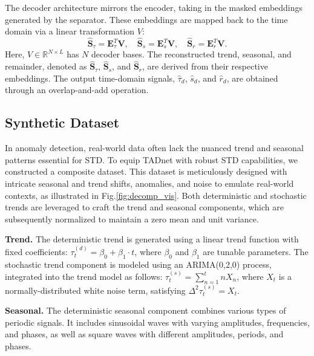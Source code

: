 \documentclass{article}
\begin{document}
The decoder architecture mirrors the encoder, taking in the masked embeddings generated by the separator. These embeddings are mapped back to the time domain via a linear transformation \( V \):
\begin{equation}
\hat{\mathbf{S}}_{\tau} = \mathbf{E}_{\tau}^T \mathbf{V},\quad
\hat{\mathbf{S}}_s = \mathbf{E}_s^T \mathbf{V},\quad
\hat{\mathbf{S}}_r = \mathbf{E}_r^T \mathbf{V}.
\end{equation}
Here, \( V\in\mathbb{R}^{N\times L}\) has \( N \) decoder bases. The reconstructed trend, seasonal, and remainder, denoted as \( \hat{\mathbf{S}}_{\tau} \), \( \hat{\mathbf{S}}_s \), and \( \hat{\mathbf{S}}_r \), are derived from their respective embeddings. The output time-domain signals, $\hat\tau_d$, $\hat s_d$, and $\hat r_d$, are obtained through an overlap-and-add operation.

\subsection{Synthetic Dataset}

In anomaly detection, real-world data often lack the nuanced trend and seasonal patterns essential for STD. To equip TADnet with robust STD capabilities, we constructed a composite dataset. This dataset is meticulously designed with intricate seasonal and trend shifts, anomalies, and noise to emulate real-world contexts, as illustrated in Fig.\ref{fig:decomp_vis}. Both deterministic and stochastic trends are leveraged to craft the trend and seasonal components, which are subsequently normalized to maintain a zero mean and unit variance.


\textbf{Trend.}
The deterministic trend is generated using a linear trend function with fixed coefficients: \( \tau_t^{(d)} = \beta_0 + \beta_1 \cdot t \), where \( \beta_0 \) and \( \beta_1 \) are tunable parameters. The stochastic trend component is modeled using an ARIMA(0,2,0) process, integrated into the trend model as follows:  $\tau_t^{(s)}=\sum_{n=1}^t n X_n$, where \( X_t \) is a normally-distributed white noise term, satisfying \( \Delta^2 \tau^{(s)}_t = X_t \).

\textbf{Seasonal.}
The deterministic seasonal component combines various types of periodic signals. It includes sinusoidal waves with varying amplitudes, frequencies, and phases, as well as square waves with different amplitudes, periods, and phases. 
\end{document}

